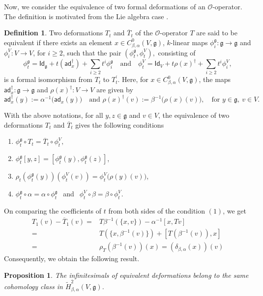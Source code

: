 \documentclass[a4paper,11pt]{amsart}
\theoremstyle{plain}
\newtheorem{proposition}[theorem]{Proposition}
\theoremstyle{definition}
\newtheorem{definition}[theorem]{Definition}
\theoremstyle{remark}
\numberwithin{equation}{section}
\begin{document}
Now, we consider the equivalence of two formal deformations of an $\mathcal{O}$-operator. The definition is motivated from the Lie algebra case \cite{Sheng3}.
\begin{definition}\label{Def:equivalence}
Two deformations $T_t$ and $\overline{T}_t$ of the $\mathcal{O}$-operator $T$ are said to be equivalent if there exists an element $x\in C^{0}_{\beta,\alpha}(V,\mathfrak{g})$, $k$-linear maps $\phi^{\mathfrak{g}}_i:\mathfrak{g}\rightarrow\mathfrak{g}$ and $\phi^V_i:V\rightarrow V$, for $i\geq 2$, such that the pair $(\phi^{\mathfrak{g}}_t,\phi^V_t),$ consisting of
$$\phi^{\mathfrak{g}}_t=\mathsf{Id}_{\mathfrak{g}}+t(\mathsf{ad}^{\dagger}_x)+\sum_{i\geq 2}t^i \phi^{\mathfrak{g}}_i \quad \mbox{and}\quad \phi^V_t=\mathsf{Id}_{V}+t\rho(x)^{\dagger}+\sum_{i\geq 2}t^i \phi^V_i,$$
is a formal isomorphism from $T_t$ to ${T}^{\prime}_t$. Here, for $x\in C^{0}_{\beta,\alpha}(V,\mathfrak{g})$, the maps $\mathsf{ad}_x^{\dagger}:\mathfrak{g}\rightarrow \mathfrak{g}$ and $\rho(x)^{\dagger}:V\rightarrow V$ are given by 
$$\mathsf{ad}^{\dagger}_x(y):=\alpha^{-1}\big(\mathsf{ad}_x(y)\big)\quad\mbox{and  }\rho(x)^{\dagger}(v):=\beta^{-1}\big(\rho(x)(v)\big),\quad\mbox{for }y\in \mathfrak{g}, ~v\in V.$$  
\end{definition}

With the above notations, for all $y,z\in \mathfrak{g}$ and $v\in V$, the equivalence of two deformations $T_t$ and $\overline{T}_t$ gives the following conditions
\begin{enumerate}
\item $\phi^{\mathfrak{g}}_t\circ T_t=\overline{T}_t\circ \phi^{V}_t,$\\\vspace{-4.5mm}
\item $\phi^{\mathfrak{g}}_t[y,z]=[\phi^{\mathfrak{g}}_t(y),\phi^{\mathfrak{g}}_t(z)]$,\\\vspace{-4mm}
\item $\rho_t(\phi^{\mathfrak{g}}_t(y))(\phi^V_t(v))=\phi^V_t\big(\rho(y)(v)\big)$,\\\vspace{-4.5mm}
\item $\phi^{\mathfrak{g}}_t\circ \alpha=\alpha\circ\phi^{\mathfrak{g}}_t~~$ and $~~\phi^V_t\circ\beta=\beta\circ\phi^V_t$.
\end{enumerate}

On comparing the coefficients of $t$ from both sides of the condition $(1)$, we get 
\begin{align*}
T_1(v)-\overline{T}_1(v)=&T\beta^{-1}(\{x,v\})-\alpha^{-1}[x,Tv]\\
=&T(\{x,\beta^{-1}(v)\})+[T(\beta^{-1}(v)),x]\\
=&\rho_T(\beta^{-1}(v))(x)=(\delta_{\beta,\alpha}(x))(v)            
\end{align*}
Consequently, we obtain the following result.
\begin{proposition}
The infinitesimals of equivalent deformations belong to the same cohomology class in $\widetilde{H}^2_{\beta,\alpha}(V,\mathfrak{g})$.
\end{proposition}
\end{document}
